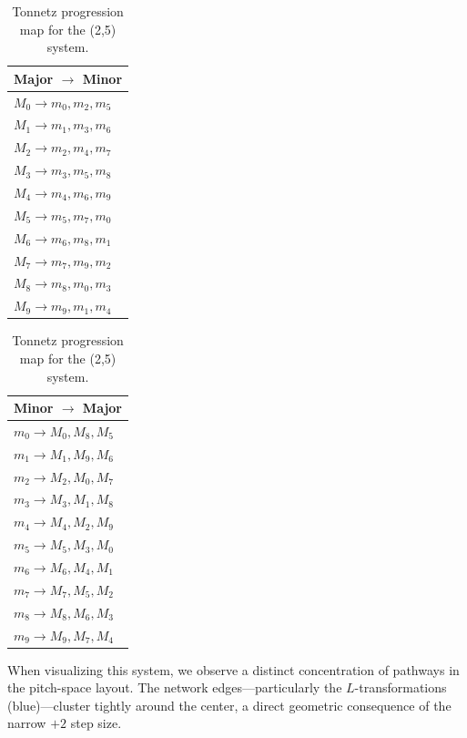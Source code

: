 \documentclass[11pt,letterpaper]{amsart}
\begin{document}
{\tiny \begin{table}[H]
    \centering
    \begin{minipage}{0.48\textwidth}
        \centering
        \begin{tabular}{l}
        \toprule
        \textbf{Major $\to$ Minor} \\
        \midrule
        $M_0 \to m_0, m_2, m_5$ \\
        $M_1 \to m_1, m_3, m_6$ \\
        $M_2 \to m_2, m_4, m_7$ \\
        $M_3 \to m_3, m_5, m_8$ \\
        $M_4 \to m_4, m_6, m_9$ \\
        $M_5 \to m_5, m_7, m_0$ \\
        $M_6 \to m_6, m_8, m_1$ \\
        $M_7 \to m_7, m_9, m_2$ \\
        $M_8 \to m_8, m_0, m_3$ \\
        $M_9 \to m_9, m_1, m_4$ \\
        \bottomrule
        \end{tabular}
    \end{minipage}\hfill
    \begin{minipage}{0.48\textwidth}
        \centering
        \begin{tabular}{l}
        \toprule
        \textbf{Minor $\to$ Major} \\
        \midrule
        $m_0 \to M_0, M_8, M_5$ \\
        $m_1 \to M_1, M_9, M_6$ \\
        $m_2 \to M_2, M_0, M_7$ \\
        $m_3 \to M_3, M_1, M_8$ \\
        $m_4 \to M_4, M_2, M_9$ \\
        $m_5 \to M_5, M_3, M_0$ \\
        $m_6 \to M_6, M_4, M_1$ \\
        $m_7 \to M_7, M_5, M_2$ \\
        $m_8 \to M_8, M_6, M_3$ \\
        $m_9 \to M_9, M_7, M_4$ \\
        \bottomrule
        \end{tabular}
    \end{minipage}
    \caption{Tonnetz progression map for the (2,5) system.}
\end{table}}

When visualizing this system, we observe a distinct concentration of pathways in the pitch-space layout. The network edges---particularly the $L$-transformations (blue)---cluster tightly around the center, a direct geometric consequence of the narrow $+2$ step size.
\end{document}
